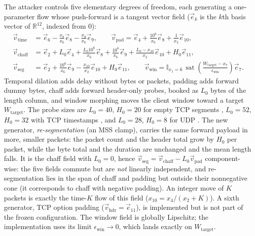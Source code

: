 The attacker controls five elementary degrees of freedom, each generating a one-parameter flow whose push-forward is a tangent vector field ($\vec e_k$ is the $k$th basis vector of $\mathbb{R}^{12}$, indexed from 0):
\begin{equation}
\label{eq:generators}
\begin{aligned}
    \vec v_{\text{time}} &= \vec e_6 - \tfrac{x_8}{x_6}\vec e_8 - \tfrac{x_9}{x_6}\vec e_9, \qquad
    \vec v_{\text{pad}} = \vec e_4 + \tfrac{10^6}{x_6}\vec e_8 + \tfrac{1}{x_2}\vec e_{10},\\
    \vec v_{\text{chaff}} &= \vec e_2 + L_0\vec e_4 + \tfrac{L_0 10^6}{x_6}\vec e_8 + \tfrac{10^6}{x_6}\vec e_9 + \tfrac{L_0-x_{10}}{x_2}\vec e_{10} + H_0\vec e_{11},\\
    \vec v_{\text{seg}} &= \vec e_2 + \tfrac{10^6}{x_6}\vec e_9 - \tfrac{x_{10}}{x_2}\vec e_{10} + H_0\vec e_{11},\qquad
    \vec v_{\text{win}} = \mathbb{I}_{x_1=6}\,\operatorname{sat}\!\left(\tfrac{W_{\text{target}}-x_7}{\epsilon_{\text{win}}}\right)\vec e_7.
\end{aligned}
\end{equation}
Temporal dilation adds delay without bytes or packets, padding adds forward dummy bytes, chaff adds forward header-only probes, booked as $L_0$ bytes of the length column, and window morphing moves the client window toward a target $W_{\text{target}}$. The probe sizes are $L_0=40$, $H_0=20$ for empty TCP segments \cite{rfc9293}, $L_0=52$, $H_0=32$ with TCP timestamps \cite{rfc7323}, and $L_0=28$, $H_0=8$ for UDP \cite{rfc768}. The new generator, \emph{re-segmentation} (an MSS clamp), carries the same forward payload in more, smaller packets: the packet count and the header total grow by $H_0$ per packet, while the byte total and the duration are unchanged and the mean length falls. It is the chaff field with $L_0=0$, hence $\vec v_{\text{seg}}=\vec v_{\text{chaff}}-L_0\vec v_{\text{pad}}$ component-wise: the five fields commute but are \emph{not} linearly independent, and re-segmentation lies in the span of chaff and padding but outside their nonnegative cone (it corresponds to chaff with negative padding). An integer move of $K$ packets is exactly the time-$K$ flow of this field ($x_{10}=x_4/(x_2+K)$). A sixth generator, TCP option padding ($\vec v_{\text{hdr}}=\vec e_{11}$), is implemented but is not part of the frozen configuration. The window field is globally Lipschitz; the implementation uses its limit $\epsilon_{\text{win}}\to0$, which lands exactly on $W_{\text{target}}$.

